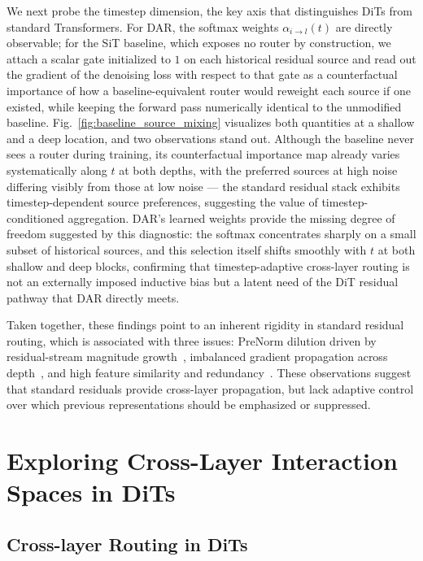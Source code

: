 \documentclass[]{ant_tech_report}
\begin{document}
We next probe the timestep dimension, the key axis that distinguishes DiTs from standard Transformers. For \textsc{DAR}, the softmax weights $\alpha_{i\to l}(t)$ are directly observable; for the SiT baseline, which exposes no router by construction, we attach a scalar gate initialized to $1$ on each historical residual source and read out the gradient of the denoising loss with respect to that gate as a counterfactual importance of how a baseline-equivalent router would reweight each source if one existed, while keeping the forward pass numerically identical to the unmodified baseline. Fig.~\ref{fig:baseline_source_mixing} visualizes both quantities at a shallow and a deep location, and two observations stand out. Although the baseline never sees a router during training, its counterfactual importance map already varies systematically along $t$ at both depths, with the preferred sources at high noise differing visibly from those at low noise --- the standard residual stack exhibits timestep-dependent source preferences, suggesting the value of timestep-conditioned aggregation. \textsc{DAR}'s learned weights provide the missing degree of freedom suggested by this diagnostic: the softmax concentrates sharply on a small subset of historical sources, and this selection itself shifts smoothly with $t$ at both shallow and deep blocks, confirming that timestep-adaptive cross-layer routing is not an externally imposed inductive bias but a latent need of the DiT residual pathway that \textsc{DAR} directly meets.

Taken together, these findings point to an inherent rigidity in standard residual routing, which is associated with three issues: PreNorm dilution driven by residual-stream magnitude growth~\citep{nguyen2019transformers,xiong2020layer,li2026siamesenorm,team2026attention}, imbalanced gradient propagation across depth~\citep{team2026attention,xie2025mhc,zhu2024hyper}, and high feature similarity and redundancy~\citep{jiang2024tracing,song2024sleb,men2025shortgpt,chen2026sortblock}. These observations suggest that standard residuals provide cross-layer propagation, but lack adaptive control over which previous representations should be emphasized or suppressed.


\section{Exploring Cross-Layer Interaction Spaces in DiTs}   \label{sec:dar}

\subsection{Cross-layer Routing in DiTs}
\end{document}
